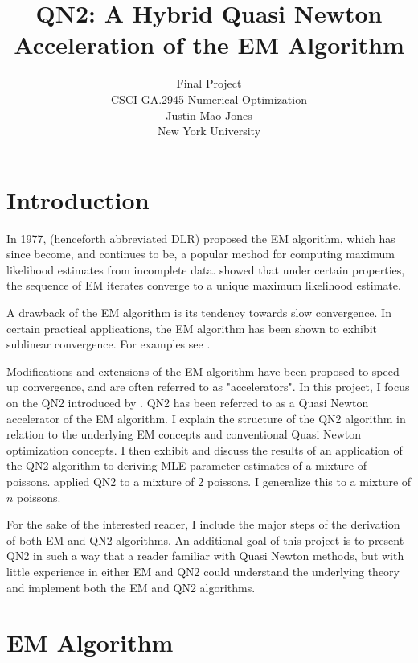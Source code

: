 \documentclass[letter,12pt]{article}
\begin{document}
\title{QN2: A Hybrid Quasi Newton Acceleration of the EM Algorithm}
\author{Final Project\\CSCI-GA.2945 Numerical Optimization\\Justin Mao-Jones\\New York University}
\renewcommand{\today}{December 14, 2014}
\maketitle

\section{Introduction}

In 1977, \citeauthor*{dempsterlr77} (henceforth abbreviated DLR) proposed the EM algorithm, which has since become, and continues to be, a popular method for computing maximum likelihood estimates from incomplete data.  \cite{wu1983} showed that under certain properties, the sequence of EM iterates converge to a unique maximum likelihood estimate.

A drawback of the EM algorithm is its tendency towards slow convergence.  In certain practical applications, the EM algorithm has been shown to exhibit sublinear convergence.  For examples see \cite{lange1995a,jamshidianj93,jamshidianj97}.

Modifications and extensions of the EM algorithm have been proposed to speed up convergence, and are often referred to as "accelerators".  In this project, I focus on the QN2 introduced by \cite{jamshidianj97}.  QN2 has been referred to as a Quasi Newton accelerator of the EM algorithm.  I explain the structure of the QN2 algorithm in relation to the underlying EM concepts and conventional Quasi Newton optimization concepts.  I then exhibit and discuss the results of an application of the QN2 algorithm to deriving MLE parameter estimates of a mixture of poissons.  \cite{jamshidianj97} applied QN2 to a mixture of 2 poissons.  I generalize this to a mixture of $n$ poissons.

For the sake of the interested reader, I include the major steps of the derivation of both EM and QN2 algorithms.  An additional goal of this project is to present QN2 in such a way that a reader familiar with Quasi Newton methods, but with little experience in either EM and QN2 could understand the underlying theory and implement both the EM and QN2 algorithms.

\section{EM Algorithm}
\end{document}
